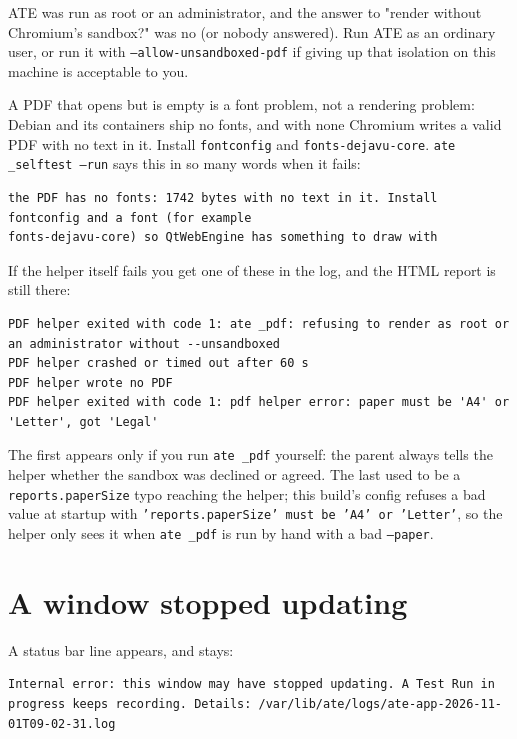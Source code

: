 ATE was run as root or an administrator, and the answer to "render without Chromium's sandbox?" was
no (or nobody answered). Run ATE as an ordinary user, or run it with
\texttt{--allow-unsandboxed-pdf} if giving up that isolation on this machine is acceptable to you.

A PDF that opens but is empty is a font problem, not a rendering problem: Debian and its containers
ship no fonts, and with none Chromium writes a valid PDF with no text in it. Install
\texttt{fontconfig} and \texttt{fonts-dejavu-core}. \texttt{ate \_selftest --run} says this in so
many words when it fails:

\begin{lstlisting}[language=ATEShell]
the PDF has no fonts: 1742 bytes with no text in it. Install fontconfig and a font (for example
fonts-dejavu-core) so QtWebEngine has something to draw with
\end{lstlisting}

If the helper itself fails you get one of these in the log, and the HTML report is still there:

\begin{lstlisting}[language=ATEShell]
PDF helper exited with code 1: ate _pdf: refusing to render as root or an administrator without --unsandboxed
PDF helper crashed or timed out after 60 s
PDF helper wrote no PDF
PDF helper exited with code 1: pdf helper error: paper must be 'A4' or 'Letter', got 'Legal'
\end{lstlisting}

The first appears only if you run \texttt{ate \_pdf} yourself: the parent always tells the helper
whether the sandbox was declined or agreed. The last used to be a \texttt{reports.paperSize} typo
reaching the helper; this build's config refuses a bad value at startup with
\texttt{'reports.paperSize' must be 'A4' or 'Letter'}, so the helper only sees it when \texttt{ate
\_pdf} is run by hand with a bad \texttt{--paper}.

\section{A window stopped updating}

A status bar line appears, and stays:

\begin{lstlisting}[language=ATEShell]
Internal error: this window may have stopped updating. A Test Run in progress keeps recording. Details: /var/lib/ate/logs/ate-app-2026-11-01T09-02-31.log
\end{lstlisting}

